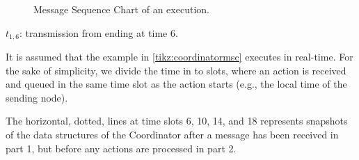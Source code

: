 \begin{figure}

\caption{Message Sequence Chart of an execution.}\label{tikz:coordinatormsc}
\end{figure}

$t_{1,6}$: transmission from  ending at time 6. \medbreak

It is assumed that the example in \autoref{tikz:coordinatormsc} executes in real-time. For the sake of simplicity, we divide the time in to slots, where an action is received and queued in the same time slot as the action starts (e.g., the local time of the sending node). \smallbreak

The horizontal, dotted, lines at time slots 6, 10, 14, and 18 represents snapshots of the data structures of the Coordinator after a message has been received in part 1, but before any actions are processed in part 2.





